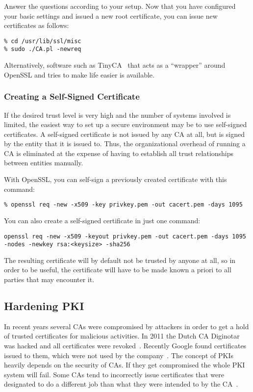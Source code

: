 Answer the questions according to your setup. Now that you have configured your basic settings and
issued a new root certificate, you can issue new certificates as follows:

\begin{lstlisting}
% cd /usr/lib/ssl/misc
% sudo ./CA.pl -newreq
\end{lstlisting}

Alternatively, software such as TinyCA~\cite{Wikipedia:TinyCA} that
acts as a ``wrapper'' around OpenSSL and tries to make life easier is
available.

\subsubsection{Creating a Self-Signed Certificate}
\label{sec:pki:selfsignedcert}
If the desired trust level is very high and the number of systems involved
is limited, the easiest way to set up a secure environment may be to use
self-signed certificates.  A self-signed certificate is not issued by any
CA at all, but is signed by the entity that it is issued to.  Thus, the
organizational overhead of running a CA is eliminated at the expense of
having to establish all trust relationships between entities manually.

With OpenSSL, you can self-sign a previously created certificate with this command:

\begin{lstlisting}
% openssl req -new -x509 -key privkey.pem -out cacert.pem -days 1095
\end{lstlisting}

You can also create a self-signed certificate in just one command:
\begin{lstlisting}
openssl req -new -x509 -keyout privkey.pem -out cacert.pem -days 1095 -nodes -newkey rsa:<keysize> -sha256
\end{lstlisting}

The resulting certificate will by default not be trusted by anyone at all,
so in order to be useful, the certificate will have to be made known a
priori to all parties that may encounter it.


\subsection{Hardening PKI}
\label{sec:hardeningpki}

In recent years several CAs were compromised by attackers in order to get a
hold of trusted certificates for malicious activities. In 2011 the Dutch CA
Diginotar was hacked and all certificates were revoked~\cite{diginotar-hack}.
Recently Google found certificates issued to them, which were not used by the
company~\cite{googlecahack}. The concept of PKIs heavily depends on the
security of CAs.  If they get compromised the whole PKI system will fail. Some
CAs tend to incorrectly issue certificates that were designated to do a
different job than what they were intended to by the CA~\cite{gocode}.

